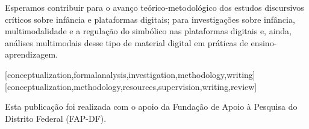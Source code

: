 \documentclass[portuguese]{textolivre}
\begin{document}
Esperamos contribuir para o avanço teórico-metodológico dos estudos discursivos críticos sobre infância e plataformas digitais; para investigações sobre infância, multimodalidade e a regulação do simbólico nas plataformas digitais e, ainda, análises multimodais desse tipo de material digital em práticas de ensino-aprendizagem.


\printbibliography\label{sec-bib}


\begin{contributors}
[conceptualization,formalanalysis,investigation,methodology,writing]
[conceptualization,methodology,resources,supervision,writing,review]
\end{contributors}

\begin{dataavailability}
\end{dataavailability}

\begin{funding}
Esta publicação foi realizada com o apoio da Fundação de Apoio à Pesquisa do Distrito Federal (FAP-DF).
\end{funding}
\end{document}
